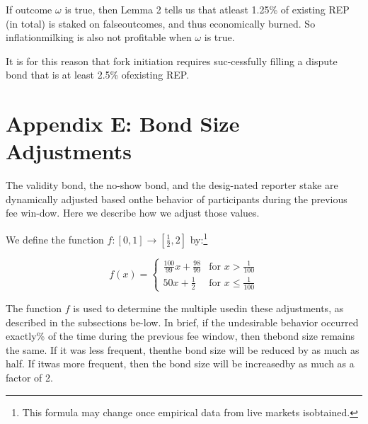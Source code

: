 \documentclass[12pt,floatfix,reprint,nofootinbib,amsmath,amssymb,epsfig,pre,floats,letterpaper,groupedaffiliation]{revtex4-1}
\theoremstyle{definition}
\theoremstyle{definition}
\begin{document}
If outcome $\omega$ is true, then Lemma 2 tells us that at\linebreak least 1.25\% of existing REP (in total) is staked on false\linebreak outcomes, and thus economically burned. So inflation\linebreak milking is also not profitable when $\omega$ is true.

It is for this reason that fork initiation requires suc-\linebreak cessfully filling a dispute bond that is at least 2.5\% of\linebreak existing REP.

\section*{Appendix E: Bond Size Adjustments}

The validity bond, the no-show bond, and the desig-\linebreak nated reporter stake are dynamically adjusted based on\linebreak the behavior of participants during the previous fee win-\linebreak dow. Here we describe how we adjust those values.

We define the function $f : [0, 1] \rightarrow [\frac{1}{2}, 2]$ by:\footnote{This formula may change once empirical data from live markets is\linebreak obtained.}

\begin{equation}
f(x) = \begin{cases}
\frac{100}{99}x + \frac{98}{99} & \text{for } x > \frac{1}{100} \\
50x + \frac{1}{2} & \text{for } x \leq \frac{1}{100}
\end{cases}\tag{E1}
\end{equation}

The function $f$ is used to determine the multiple used\linebreak in these adjustments, as described in the subsections be-\linebreak low. In brief, if the undesirable behavior occurred exactly\% of the time during the previous fee window, then the\linebreak bond size remains the same. If it was less frequent, then\linebreak the bond size will be reduced by as much as half. If it\linebreak was more frequent, then the bond size will be increased\linebreak by as much as a factor of 2.
\end{document}
